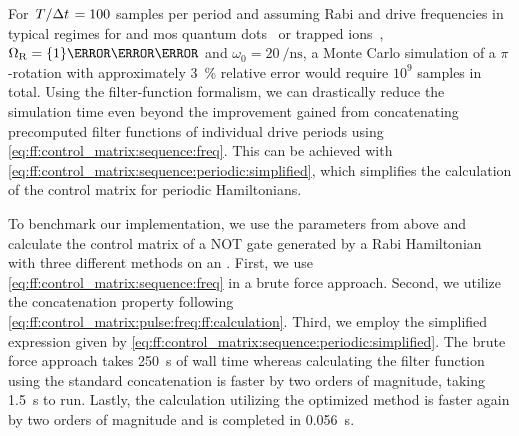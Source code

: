 For $\flatfrac{T}{\Delta t} = 100$ samples per period and assuming Rabi and drive frequencies in typical regimes for  and \acrshort{mos} quantum dots~\cite{Zajac2018,Pla2012} or trapped ions~\cite{Soare2014}, $\Omega_\mr{R} = \qty{1}{\per\micro\second}$ and $\omega_0 = \qty{20}{\per\nano\second}$, a Monte Carlo simulation of a $\pi$-rotation with approximately \qty{3}{\percent} relative error would require $10^9$ samples in total.
Using the filter-function formalism, we can drastically reduce the simulation time even beyond the improvement gained from concatenating precomputed filter functions of individual drive periods using \cref{eq:ff:control_matrix:sequence:freq}.
This can be achieved with \cref{eq:ff:control_matrix:sequence:periodic:simplified}, which simplifies the calculation of the control matrix for periodic Hamiltonians.

To benchmark our implementation, we use the parameters from above and calculate the control matrix of a NOT gate generated by a Rabi Hamiltonian with three different methods on an \fastprocessor.
First, we use \cref{eq:ff:control_matrix:sequence:freq} in a brute force approach.
Second, we utilize the concatenation property following \cref{eq:ff:control_matrix:pulse:freq:ff:calculation}.
Third, we employ the simplified expression given by \cref{eq:ff:control_matrix:sequence:periodic:simplified}.
The brute force approach takes \qty{250}{\second} of wall time whereas calculating the filter function using the standard concatenation is faster by two orders of magnitude, taking \qty{1.5}{\second} to run.
Lastly, the calculation utilizing the optimized method is faster again by two orders of magnitude and is completed in \qty{0.056}{\second}.

